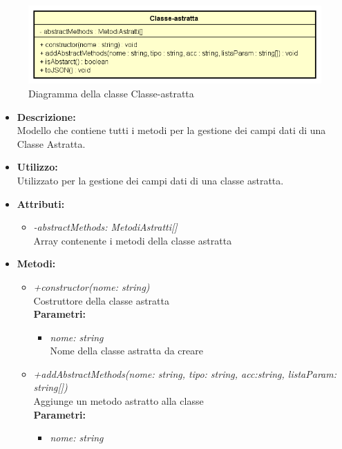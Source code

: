 \begin{figure}[h!]
	\centering
	\includegraphics[scale=0.8]{res/sections/SpecificaFrontEnd/Services/Disegnetti/classe-astratta.png}
	\caption{Diagramma della classe Classe-astratta}
\end{figure}

\begin{itemize}
	\item \textbf{Descrizione:}\\
	Modello che contiene tutti i metodi per la gestione dei campi dati di una Classe Astratta.
	\item \textbf{Utilizzo:}\\
	Utilizzato per  la gestione dei campi dati di una classe astratta.
	\item \textbf{Attributi:}
		\begin{itemize}
			\item \emph{-abstractMethods: MetodiAstratti[]}\\
			Array contenente i metodi della classe astratta
		\end{itemize}
	\item \textbf{Metodi:}
		\begin{itemize}
			\item \emph{+constructor(nome: string)}\\
    		Costruttore della classe astratta\\
    		\textbf{Parametri:}
    		\begin{itemize}
    			\item \emph{nome: string}\\
    			Nome della classe astratta da creare
    		\end{itemize}
    		\item \emph{+addAbstractMethods(nome: string, tipo: string, acc:string, listaParam: string[])}\\
    		Aggiunge un metodo astratto alla classe\\
    		\textbf{Parametri:}
    		\begin{itemize}
    			\item \emph{nome: string}\\

\end{itemize}
\end{itemize}
\end{itemize}
